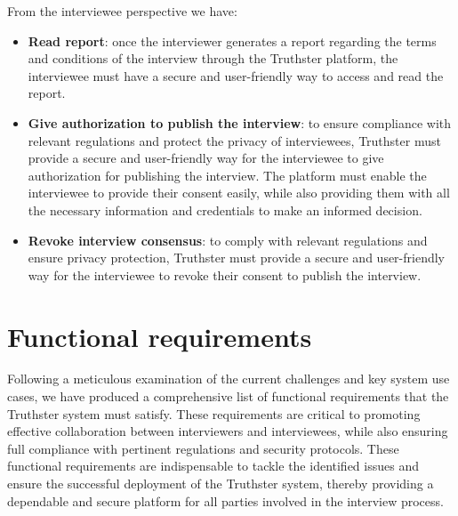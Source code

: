 \documentclass[target=mst,aauheader=]{thud}
\begin{document}
From the interviewee perspective we have:
\begin{itemize}
    \item \textbf{Read report}: once the interviewer generates a report regarding the terms and conditions of the interview through the Truthster platform, the interviewee must have a secure and user-friendly way to access and read the report.
    \item \textbf{Give authorization to publish the interview}: to ensure compliance with relevant regulations and protect the privacy of interviewees, Truthster must provide a secure and user-friendly way for the interviewee to give authorization for publishing the interview. The platform must enable the interviewee to provide their consent easily, while also providing them with all the necessary information and credentials to make an informed decision.
    \item \textbf{Revoke interview consensus}: to comply with relevant regulations and ensure privacy protection, Truthster must provide a secure and user-friendly way for the interviewee to revoke their consent to publish the interview.
\end{itemize}

\section{Functional requirements}

Following a meticulous examination of the current challenges and key system use cases, we have produced a comprehensive list of functional requirements that the Truthster system must satisfy. These requirements are critical to promoting effective collaboration between interviewers and interviewees, while also ensuring full compliance with pertinent regulations and security protocols. These functional requirements are indispensable to tackle the identified issues and ensure the successful deployment of the Truthster system, thereby providing a dependable and secure platform for all parties involved in the interview process.
\end{document}
